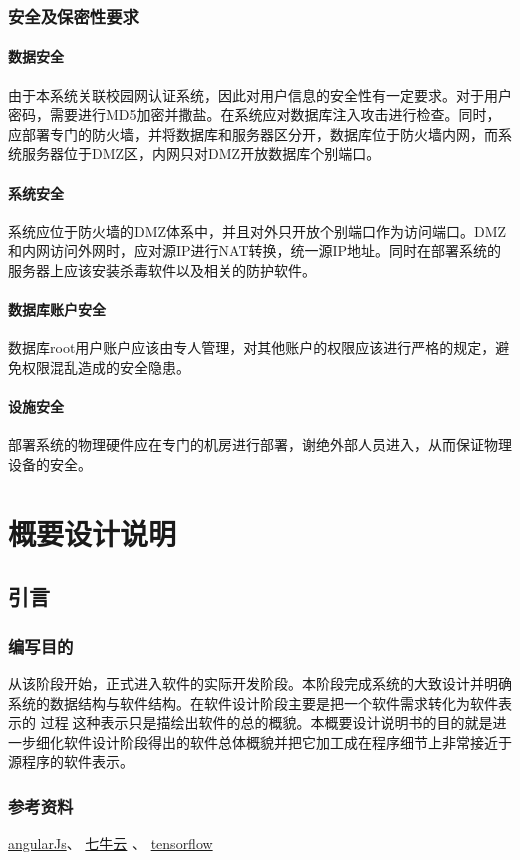\documentclass[UTF8]{ctexart}
\begin{document}
\subsubsection{安全及保密性要求}
\paragraph{数据安全}
由于本系统关联校园网认证系统，因此对用户信息的安全性有一定要求。对于用户密码，需要进行MD5加密并撒盐。在系统应对数据库注入攻击进行检查。同时，应部署专门的防火墙，并将数据库和服务器区分开，数据库位于防火墙内网，而系统服务器位于DMZ区，内网只对DMZ开放数据库个别端口。

\paragraph{系统安全}
系统应位于防火墙的DMZ体系中，并且对外只开放个别端口作为访问端口。DMZ和内网访问外网时，应对源IP进行NAT转换，统一源IP地址。同时在部署系统的服务器上应该安装杀毒软件以及相关的防护软件。

\paragraph{数据库账户安全}
数据库root用户账户应该由专人管理，对其他账户的权限应该进行严格的规定，避免权限混乱造成的安全隐患。

\paragraph{设施安全}
部署系统的物理硬件应在专门的机房进行部署，谢绝外部人员进入，从而保证物理设备的安全。


\section{概要设计说明}
\subsection{引言}
\subsubsection{编写目的}
从该阶段开始，正式进入软件的实际开发阶段。本阶段完成系统的大致设计并明确系统的数据结构与软件结构。在软件设计阶段主要是把一个软件需求转化为软件表示的 过程这种表示只是描绘出软件的总的概貌。本概要设计说明书的目的就是进一步细化软件设计阶段得出的软件总体概貌并把它加工成在程序细节上非常接近于源程序的软件表示。
\subsubsection{参考资料}
\href{https://angularjs.org/}{angularJs}、
\href{http://developer.qiniu.com/code/v7/sdk/java.html}{七牛云} 、
\href{http://www.tensorfly.cn/}{tensorflow}
\end{document}
